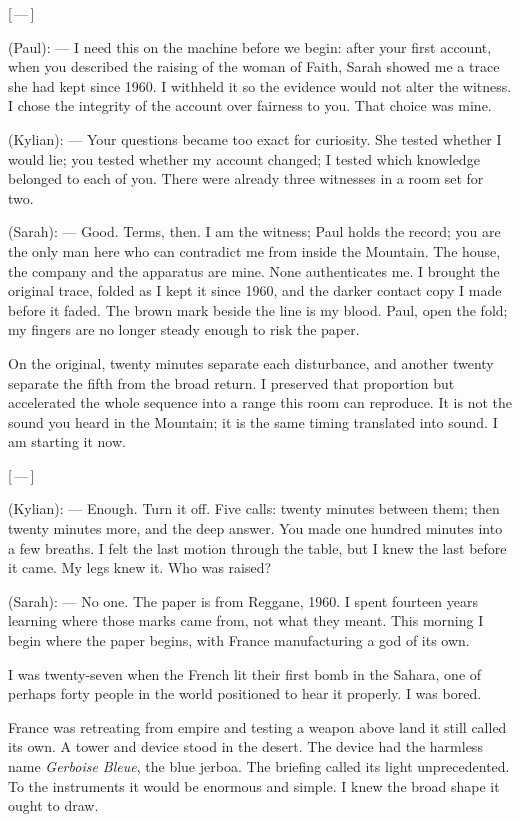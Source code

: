 \begin{room}
\centerline{[\,---\,]}

(Paul): --- I need this on the machine before we begin: after your first account, when you described the raising of the woman of Faith, Sarah showed me a trace she had kept since 1960. I withheld it so the evidence would not alter the witness. I chose the integrity of the account over fairness to you. That choice was mine.

(Kylian): --- Your questions became too exact for curiosity. She tested whether I would lie; you tested whether my account changed; I tested which knowledge belonged to each of you. There were already three witnesses in a room set for two.

(Sarah): --- Good. Terms, then. I am the witness; Paul holds the record; you are the only man here who can contradict me from inside the Mountain. The house, the company and the apparatus are mine. None authenticates me. I brought the original trace, folded as I kept it since 1960, and the darker contact copy I made before it faded. The brown mark beside the line is my blood. Paul, open the fold; my fingers are no longer steady enough to risk the paper.

On the original, twenty minutes separate each disturbance, and another twenty separate the fifth from the broad return. I preserved that proportion but accelerated the whole sequence into a range this room can reproduce. It is not the sound you heard in the Mountain; it is the same timing translated into sound. I am starting it now.

\centerline{[\,---\,]}

(Kylian): --- Enough. Turn it off. Five calls: twenty minutes between them; then twenty minutes more, and the deep answer. You made one hundred minutes into a few breaths. I felt the last motion through the table, but I knew the last before it came. My legs knew it. Who was raised?

(Sarah): --- No one. The paper is from Reggane, 1960. I spent fourteen years learning where those marks came from, not what they meant. This morning I begin where the paper begins, with France manufacturing a god of its own.

\end{room}

I was twenty-seven when the French lit their first bomb in the Sahara, one of perhaps forty people in the world positioned to hear it properly. I was bored.\par

France was retreating from empire and testing a weapon above land it still called its own. A tower and device stood in the desert. The device had the harmless name \emph{Gerboise Bleue}, the blue jerboa. The briefing called its light unprecedented. To the instruments it would be enormous and simple. I knew the broad shape it ought to draw.\par

